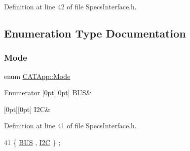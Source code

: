 Definition at line 42 of file Specs\+Interface.\+h.



\subsection{Enumeration Type Documentation}
\mbox{\label{namespaceCATApp_addde02095b318dd29aad22bf91fbf5c7}} 
\subsubsection{\texorpdfstring{Mode}{Mode}}
{\footnotesize\ttfamily enum \hyperlink{namespaceCATApp_addde02095b318dd29aad22bf91fbf5c7}{C\+A\+T\+App\+::\+Mode}}

\begin{DoxyEnumFields}{Enumerator}
[0pt][0pt]{}\mbox{\label{namespaceCATApp_addde02095b318dd29aad22bf91fbf5c7aa5eeb9b5908cf99ffe6cd93cf235579d}} 
B\+US&\\
\hline

[0pt][0pt]{}\mbox{\label{namespaceCATApp_addde02095b318dd29aad22bf91fbf5c7af0a8d8add7a4fb23e99e6ea6e09e5a59}} 
I2C&\\
\hline

\end{DoxyEnumFields}


Definition at line 41 of file Specs\+Interface.\+h.


\begin{DoxyCode}
41 \{ \hyperlink{namespaceCATApp_addde02095b318dd29aad22bf91fbf5c7aa5eeb9b5908cf99ffe6cd93cf235579d}{BUS} , \hyperlink{namespaceCATApp_addde02095b318dd29aad22bf91fbf5c7af0a8d8add7a4fb23e99e6ea6e09e5a59}{I2C}   \} ;
\end{DoxyCode}
\mbox{\label{namespaceCATApp_a10d106f6dbef9da3b1ba48892278b9c4}} 
